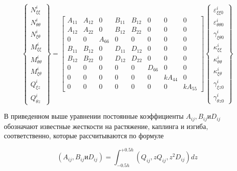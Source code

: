\begin{equation}
	\label{eq:vibro1:12}
	\begin{Bmatrix}
		N_{\xi \xi}^{i}\\
		N_{\theta \theta}^{i} \\
		N_{\xi \theta}^{i} \\
		M_{\xi \xi}^{i} \\
		M_{\theta \theta}^{i}\\
		M_{\xi \theta}^{i}\\
		Q_{\xi z}^{i}\\
		Q_{\theta z}^{i}	
	\end{Bmatrix} =
\begin{bmatrix}
	A_{11} & A_{12} & 0 & B_{11} & B_{12} & 0 & 0 & 0 \\
	A_{12} & A_{22} & 0 & B_{12} & B_{22} & 0 & 0 & 0 \\
	0 & 0 & A_{66} & 0 & 0 & 0 & 0 & 0 \\
	B_{11} & B_{12} & 0 & D_{11} & D_{12} & 0 & 0 & 0 \\
	B_{12} & B_{22} & 0 & D_{12} & D_{22} & 0 & 0 & 0 \\
	0 & 0 & 0 & 0 & 0 & D_{66} & 0 & 0 \\
	0 & 0 & 0 & 0 & 0 & 0 & k A_{44} & 0 \\
	0 & 0 & 0 & 0 & 0 & 0 & 0 & k A_{55}
\end{bmatrix}
	\begin{Bmatrix}
		\varepsilon_{\xi \xi 0}^{i}\\
		\varepsilon_{\theta \theta 0}^{i} \\
		\gamma_{\xi \theta 0}^{i} \\
		\kappa_{\xi \xi }^{i} \\
		\kappa_{\theta \theta}^{i}\\
		\kappa_{\xi \theta}^{i}\\
		\gamma_{\xi z 0}^{i}\\
		\gamma_{\theta z 0}^{i}
	\end{Bmatrix}
\end{equation}

В приведенном выше уравнении постоянные коэффициенты \(A_{i j} , B_{i j} и D_{i j}\) обозначают известные жесткости на растяжение, каплинга и изгиба, соответственно, которые рассчитываются по формуле

\begin{equation}
	\label{eq:vibro1:13}
	\left ( A_{i j} , B_{i j} и D_{i j} \right ) = \int_{-0.5 h}^{+0.5h} \left ( Q_{i j} , zQ_{i j} , z^2 D_{i j} \right ) dz
\end{equation}

